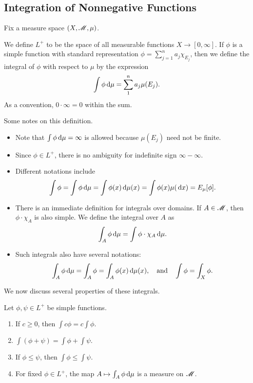 \documentclass[12pt]{article} %
\begin{document}
\subsection{Integration of Nonnegative Functions}

Fix a measure space $(X, \mathscr{M}, \mu)$. 

\begin{definition}
    We define $L^+$ to be the space of all measurable functions $X \to [0,\infty]$. If $\phi$ is a simple function with standard representation $\phi = \sum_{j=1}^n a_j \chi_{E_j}$, then we define the integral of $\phi$ with respect to $\mu$ by the expression \[\int \phi \, \mathrm{d} \mu = \sum_1^n a_j \mu(E_j).\] As a convention, $0 \cdot \infty = 0$ within the sum.
\end{definition}

\begin{remark}
    Some notes on this definition.
    \begin{itemize}
        \item Note that $\int \phi \, \mathrm{d} \mu = \infty$ is allowed because $\mu(E_j)$ need not be finite. 
        \item Since $\phi \in L^+$, there is no ambiguity for indefinite sign $\infty - \infty$.
        \item Different notations include \[\int\phi = \int \phi \, \mathrm{d} \mu = \int \phi(x) \, \mathrm{d} \mu(x) = \int \phi(x) \mu(\, \mathrm{d} x) = E_\mu[\phi].\]
        \item There is an immediate definition for integrals over domains. If $A \in \mathscr{M}$, then $\phi \cdot \chi_A$ is also simple. We define the integral over $A$ as \[\int_A \phi \, \mathrm{d} \mu = \int \phi \cdot \chi_A \, \mathrm{d} \mu.\]
        \item Such integrals also have several notations: \[\int_A \phi \, \mathrm{d} \mu = \int_A \phi = \int_A \phi(x) \, \mathrm{d} \mu(x), \ \ \ \text{and} \ \ \ \int \phi = \int_X \phi.\]
    \end{itemize}
\end{remark}

We now discuss several properties of these integrals.

\begin{proposition}
    Let $\phi, \psi \in L^+$ be simple functions. \begin{enumerate}
        \item If $c \geq 0$, then $\int c \phi = c \int \phi$.
        \item $\int (\phi + \psi) = \int \phi + \int \psi$.
        \item If $\phi \leq \psi$, then $\int \phi \leq \int \psi$.
        \item For fixed $\phi \in L^+$, the map $A \mapsto \int_A \phi \, \mathrm{d} \mu$ is a measure on $\mathscr{M}$.
    \end{enumerate}
\end{proposition}
\end{document}
